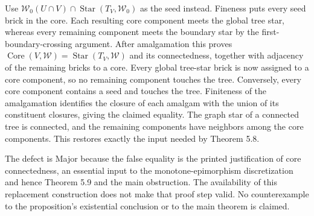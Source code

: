 \documentclass[10pt]{article}
\begin{document}
Use \(\mathcal W_0(U\cap V)\cap\operatorname{Star}(T_V,\mathcal W_0)\) as the seed instead. Fineness puts every seed brick in the core. Each resulting core component meets the global tree star, whereas every remaining component meets the boundary star by the first-boundary-crossing argument. After amalgamation this proves \(\operatorname{Core}(V,\mathcal W)=\operatorname{Star}(T_V,\mathcal W)\) and its connectedness, together with adjacency of the remaining bricks to a core. Every global tree-star brick is now assigned to a core component, so no remaining component touches the tree. Conversely, every core component contains a seed and touches the tree. Finiteness of the amalgamation identifies the closure of each amalgam with the union of its constituent closures, giving the claimed equality. The graph star of a connected tree is connected, and the remaining components have neighbors among the core components. This restores exactly the input needed by Theorem 5.8.\par
The defect is Major because the false equality is the printed justification of core connectedness, an essential input to the monotone-epimorphism discretization and hence Theorem 5.9 and the main obstruction. The availability of this replacement construction does not make that proof step valid. No counterexample to the proposition’s existential conclusion or to the main theorem is claimed.\par
\end{document}
